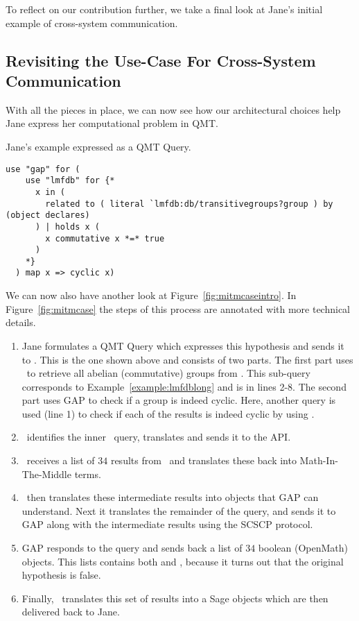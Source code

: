 To reflect on our contribution further, we take a final look at Jane's initial example of cross-system communication. 

\subsection{Revisiting the Use-Case For Cross-System Communication}\label{sec:conclusion:example}

With all the pieces in place, we can now see how our architectural choices help Jane express her computational problem in QMT. 

\begin{example}\label{example:cross}
  Jane's example expressed as a QMT Query. 
  \begin{lstlisting}[language=qmt]
  use "gap" for (
    use "lmfdb" for {*
      x in (
        related to ( literal `lmfdb:db/transitivegroups?group ) by (object declares)
      ) | holds x (
        x commutative x *=* true
      )
    *} 
  ) map x => cyclic x)
  \end{lstlisting}
\end{example}


We can now also have another look at Figure~\ref{fig:mitmcaseintro}. 
In Figure~\ref{fig:mitmcase} the steps of this process are annotated with more technical details. 
\begin{enumerate}
  \item Jane formulates a QMT Query which expresses this hypothesis and sends it to \mmt. 
  This is the one shown above and consists of two parts. 
  The first part uses \lmfdb\ to retrieve all abelian (commutative) groups from \lmfdb. 
  This sub-query corresponds to Example~\ref{example:lmfdblong} and is in lines 2-8. 
  The second part uses GAP to check if a group is indeed cyclic. 
  Here, another  query is used (line 1) to check if each of the results is indeed cyclic by using . 
  
  \item \mmt\ identifies the inner \lmfdb\ query, translates and sends it to the \lmfdb API. 
  
  \item \mmt\ receives a list of $34$ results from \lmfdb\ and translates these back into Math-In-The-Middle terms. 
  
  \item \mmt\ then translates these intermediate results into objects that GAP can understand. 
  Next it translates the remainder of the query, and sends it to GAP along with the intermediate results using the SCSCP protocol. 
  
  \item GAP responds to the query and sends back a list of $34$ boolean (OpenMath) objects.
  This lists contains both  and , because it turns out that the original hypothesis is false. 
  
  \item Finally, \mmt\ translates this set of results into a Sage objects which are then delivered back to Jane. 
\end{enumerate}

